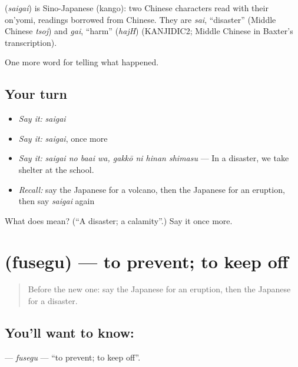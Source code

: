 \begin{cousinweb}
\textbf{} (\emph{saigai}) is Sino-Japanese (kango): two Chinese characters read with their on'yomi, readings borrowed from Chinese. They are \emph{sai}, \textquotedblleft{}disaster\textquotedblright{} (Middle Chinese \emph{tsoj}) and \emph{gai}, \textquotedblleft{}harm\textquotedblright{} (\emph{hajH}) (KANJIDIC2; Middle Chinese in Baxter's transcription).
\end{cousinweb}

\begin{grammarlens}[title={What you've built}]
One more word for telling what happened.
\end{grammarlens}

\subsection*{Your turn}
\begin{itemize}
\raggedright
  \item \emph{Say it:} \emph{saigai}
  \item \emph{Say it:} \emph{saigai}, once more
  \item \emph{Say it:} \emph{saigai no baai wa, gakkō ni hinan shimasu} — In a disaster, we take shelter at the school.
  \item \emph{Recall:} say the Japanese for a volcano, then the Japanese for an eruption, then say \emph{saigai} again
\end{itemize}

\begin{tcolorbox}[breakable,colback=teal!4,colframe=teal!35!black,title={Before you move on}]
What does  mean? (\textquotedblleft{}A disaster; a calamity\textquotedblright{}.) Say it once more.
\end{tcolorbox}
\section[\texorpdfstring{\ja{ふせぐ} (fusegu)}{ふせぐ (fusegu)}]{ (fusegu) — to prevent; to keep off}

\label{lesson:JA-C279-fusegu}



\begin{quote}
Before the new one: say the Japanese for an eruption, then the Japanese for a disaster.
\end{quote}

\subsection*{You'll want to know: }
\textbf{} — \emph{fusegu} — \textquotedblleft{}to prevent; to keep off\textquotedblright{}.

